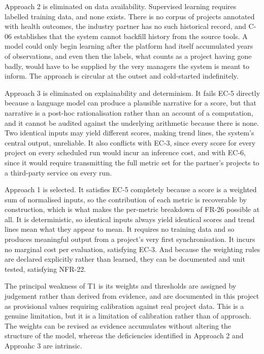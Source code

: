 Approach 2 is eliminated on data availability. Supervised learning requires labelled
training data, and none exists. There is no corpus of projects annotated with
health outcomes, the industry partner has no such historical record, and C-06 establishes
that the system cannot backfill history from the source tools. A model could only
begin learning after the platform had itself accumulated years of observations,
and even then the labels, what counts as a project having gone badly, would
have to be supplied by the very managers the system is meant to inform. The
approach is circular at the outset and cold-started indefinitely.

Approach 3 is eliminated on explainability and determinism. It fails EC-5 directly because a
language model can produce a plausible narrative for a score, but that narrative
is a post-hoc rationalisation rather than an account of a computation, and it
cannot be audited against the underlying arithmetic because there is none. Two
identical inputs may yield different scores, making trend lines, the system's
central output, unreliable. It also conflicts with EC-3, since every score for
every project on every scheduled run would incur an inference cost, and with
EC-6, since it would require transmitting the full metric set for the partner's
projects to a third-party service on every run.

Approach 1 is selected. It satisfies EC-5 completely because a score is a weighted sum of
normalised inputs, so the contribution of each metric is recoverable by
construction, which is what makes the per-metric breakdown of FR-26 possible at
all. It is deterministic, so identical inputs always yield identical scores and
trend lines mean what they appear to mean. It requires no training data and so
produces meaningful output from a project's very first synchronisation. It incurs
no marginal cost per evaluation, satisfying EC-3. And because the weighting rules
are declared explicitly rather than learned, they can be documented and unit
tested, satisfying NFR-22.

The principal weakness of T1 is its weights and
thresholds are assigned by judgement rather than derived from evidence, and are
documented in this project as provisional values requiring calibration against
real project data. This is a genuine limitation, but it is a limitation of
calibration rather than of approach. The weights can be revised as
evidence accumulates without altering the structure of the model, whereas the
deficiencies identified in Approach 2 and Approahc 3 are intrinsic.

